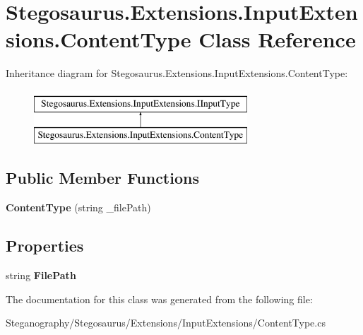 \hypertarget{class_stegosaurus_1_1_extensions_1_1_input_extensions_1_1_content_type}{}\section{Stegosaurus.\+Extensions.\+Input\+Extensions.\+Content\+Type Class Reference}
\label{class_stegosaurus_1_1_extensions_1_1_input_extensions_1_1_content_type}
Inheritance diagram for Stegosaurus.\+Extensions.\+Input\+Extensions.\+Content\+Type\+:\begin{figure}[H]
\begin{center}
\leavevmode
\includegraphics[height=2.000000cm]{class_stegosaurus_1_1_extensions_1_1_input_extensions_1_1_content_type}
\end{center}
\end{figure}
\subsection*{Public Member Functions}
\begin{DoxyCompactItemize}
\item 
{\bfseries Content\+Type} (string \+\_\+file\+Path)\hypertarget{class_stegosaurus_1_1_extensions_1_1_input_extensions_1_1_content_type_a4ec62e99c27424bf0e35a291442cd7c0}{}\label{class_stegosaurus_1_1_extensions_1_1_input_extensions_1_1_content_type_a4ec62e99c27424bf0e35a291442cd7c0}

\end{DoxyCompactItemize}
\subsection*{Properties}
\begin{DoxyCompactItemize}
\item 
string {\bfseries File\+Path}\hypertarget{class_stegosaurus_1_1_extensions_1_1_input_extensions_1_1_content_type_a33511db053db12bf2742e48c752497af}{}\label{class_stegosaurus_1_1_extensions_1_1_input_extensions_1_1_content_type_a33511db053db12bf2742e48c752497af}

\end{DoxyCompactItemize}


The documentation for this class was generated from the following file\+:\begin{DoxyCompactItemize}
\item 
Steganography/\+Stegosaurus/\+Extensions/\+Input\+Extensions/Content\+Type.\+cs\end{DoxyCompactItemize}
